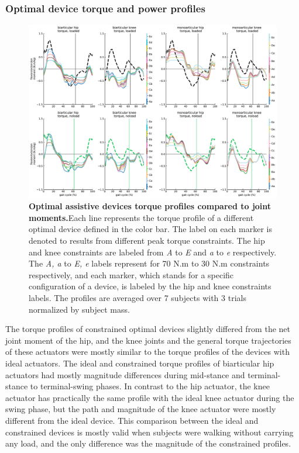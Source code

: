 \documentclass[10pt,letterpaper]{article}
\begin{document}
\subsubsection*{Optimal device torque and power profiles }
\begin{figure}[ht]   
	\centering
	\includegraphics[width=\linewidth]{Pareto_Simulations_Figures/PaperFigure_Paretofront_TorqueProfiles.pdf}
	\vspace{1mm}
	\caption{{\small\textbf{Optimal assistive devices torque profiles compared to joint moments.}Each line represents the torque profile of a different optimal device defined in the color bar. The label on each marker is denoted to results from different peak torque constraints. The hip and knee constraints are labeled from {\it A} to {\it E} and {\it a} to {\it e} respectively. The {\it A, a} to {\it E, e} labels represent for 70 N.m to 30 N.m constraints respectively, and each marker, which stands for a specific configuration of a device, is labeled by the hip and knee constraints labels. The profiles are averaged over 7 subjects with 3 trials normalized by subject mass.}}
	\label{Fig_Paretofronts_Torque_Profiles}
\end{figure}
The torque profiles of constrained optimal devices slightly differed from the net joint moment of the hip, and the knee joints and the general torque trajectories of these actuators were mostly similar to the torque profiles of the devices with ideal actuators. The ideal and constrained torque profiles of biarticular hip actuators had mostly magnitude differences during mid-stance and terminal-stance to terminal-swing phases. In contrast to the hip actuator, the knee actuator has practically the same profile with the ideal knee actuator during the swing phase, but the path and magnitude of the knee actuator were mostly different from the ideal device. This comparison between the ideal and constrained devices is mostly valid when subjects were walking without carrying any load, and the only difference was the magnitude of the constrained profiles.\\
\end{document}
